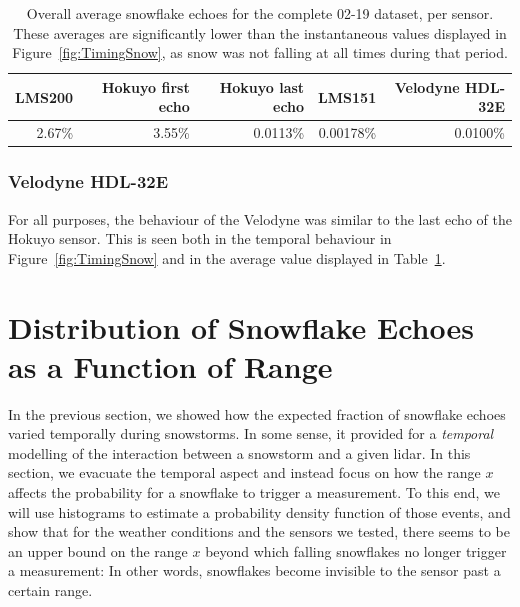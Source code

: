 \begin{table}
    \centering
    \begin{tabular}{@{}rrrrr@{}}
        \toprule
        \textbf{LMS200} & \textbf{Hokuyo first echo}     & \textbf{Hokuyo last echo}    & \textbf{LMS151} & \textbf{Velodyne HDL-32E} \\
        \hline
        2.67\%          &           3.55\%    &       0.0113\%     &   0.00178\%     &  0.0100\%  \\
        \bottomrule
    \end{tabular}
    \caption[Overall average snowflake echoes for the complete 02-19 dataset, per sensor.]{Overall average snowflake echoes for the complete 02-19 dataset, per sensor. These averages are significantly lower than the instantaneous values displayed in Figure~\ref{fig:TimingSnow}, as snow was not falling at all times during that period.}
    \label{tab:avgRates}
\end{table}

\subsubsection{Velodyne HDL-32E}
For all purposes, the behaviour of the Velodyne was similar to the last echo of the Hokuyo sensor. This is seen both in the temporal behaviour in Figure~\ref{fig:TimingSnow} and in the average value displayed in Table~\ref{tab:avgRates}.

\section{Distribution of Snowflake Echoes as a Function of Range}
\label{sec:chap_lidar_histo}

In the previous section, we showed how the expected fraction of snowflake echoes varied temporally during snowstorms. In some sense, it provided for a \emph{temporal} modelling of the interaction between a snowstorm and a given \gls*{lidar}. In this section, we evacuate the temporal aspect and instead focus on how the range $x$ affects the probability for a snowflake to trigger a measurement. To this end, we will use histograms to estimate a probability density function of those events, and show that for the weather conditions and the sensors we tested, there seems to be an upper bound on the range $x$ beyond which falling snowflakes no longer trigger a measurement: In other words, snowflakes become invisible to the sensor past a certain range.

